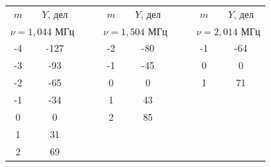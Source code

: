 \documentclass[a4paper,12pt]{article} %
\begin{document}
\begin{enumerate}
		\begin{table}[h!]
			\centering
				\begin{tabular}{|cc|cccclccc}
					\cline{1-2} \cline{5-6} \cline{9-10}
					\multicolumn{1}{|c|}{$m$}  & $Y$, дел &  & \multicolumn{1}{c|}{} & \multicolumn{1}{c|}{$m$} & \multicolumn{1}{c|}{$Y$, дел} &  & \multicolumn{1}{c|}{} & \multicolumn{1}{c|}{$m$} & \multicolumn{1}{c|}{$Y$, дел} \\ \cline{1-2} \cline{5-6} \cline{9-10} 
					\multicolumn{2}{|c|}{$\nu = 1,044$ МГц} &  & \multicolumn{1}{c|}{} & \multicolumn{2}{c|}{$\nu = 1,504$ МГц}                     &  & \multicolumn{1}{c|}{} & \multicolumn{2}{c|}{$\nu = 2,014$ МГц}                     \\ \cline{1-2} \cline{5-6} \cline{9-10} 
					\multicolumn{1}{|c|}{-4}   & -127     &  & \multicolumn{1}{c|}{} & \multicolumn{1}{c|}{-2}  & \multicolumn{1}{c|}{-80}      &  & \multicolumn{1}{c|}{} & \multicolumn{1}{c|}{-1}  & \multicolumn{1}{c|}{-64}      \\ \cline{1-2} \cline{5-6} \cline{9-10} 
					\multicolumn{1}{|c|}{-3}   & -93      &  & \multicolumn{1}{c|}{} & \multicolumn{1}{c|}{-1}  & \multicolumn{1}{c|}{-45}      &  & \multicolumn{1}{c|}{} & \multicolumn{1}{c|}{0}   & \multicolumn{1}{c|}{0}        \\ \cline{1-2} \cline{5-6} \cline{9-10} 
					\multicolumn{1}{|c|}{-2}   & -65      &  & \multicolumn{1}{c|}{} & \multicolumn{1}{c|}{0}   & \multicolumn{1}{c|}{0}        &  & \multicolumn{1}{c|}{} & \multicolumn{1}{c|}{1}   & \multicolumn{1}{c|}{71}       \\ \cline{1-2} \cline{5-6} \cline{9-10} 
					\multicolumn{1}{|c|}{-1}   & -34      &  & \multicolumn{1}{c|}{} & \multicolumn{1}{c|}{1}   & \multicolumn{1}{c|}{43}       &  &                       &                          &                               \\ \cline{1-2} \cline{5-6}
					\multicolumn{1}{|c|}{0}    & 0        &  & \multicolumn{1}{c|}{} & \multicolumn{1}{c|}{2}   & \multicolumn{1}{c|}{85}       &  &                       &                          &                               \\ \cline{1-2} \cline{5-6}
					\multicolumn{1}{|c|}{1}    & 31       &  &                       &                          &                               &  &                       &                          &                               \\ \cline{1-2}
					\multicolumn{1}{|c|}{2}    & 69       &  &                       &                          &                               &  &                       &                          &                               \\ \cline{1-2}

\end{tabular}
\end{table}
\end{enumerate}
\end{document}
